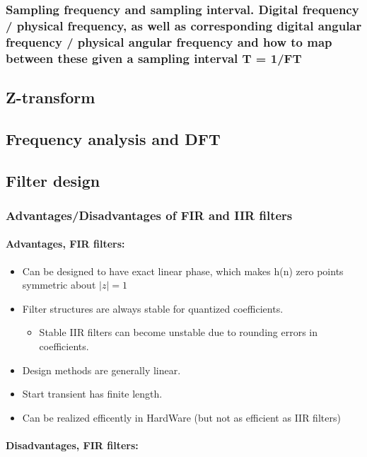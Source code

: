 \documentclass{article}
\begin{document}
\subsubsection{Sampling frequency and sampling interval. Digital frequency / physical frequency, as well as
corresponding digital angular frequency / physical angular frequency and how to map between these
given a sampling interval T = 1/FT}
\subsection{Z-transform}

\subsection{Frequency analysis and DFT}

\subsection{Filter design}

\subsubsection{Advantages/Disadvantages of FIR and IIR filters}
\paragraph{Advantages, FIR filters:}
\begin{itemize}
    \item Can be designed to have exact linear phase, which makes h(n) zero points symmetric about $|z| = 1$
    \item  Filter structures are always stable for quantized coefficients.
    \begin{itemize}
        \item Stable IIR filters can become unstable due to rounding errors in coefficients.
    \end{itemize}
    \item Design methods are generally linear. 
    \item Start transient has finite length.
    \item Can be realized efficently in HardWare (but not as efficient as IIR filters)
\end{itemize}

\paragraph{Disadvantages, FIR filters:}
\end{document}
